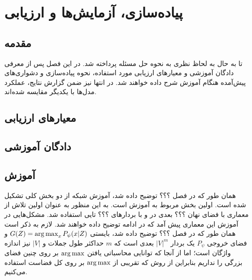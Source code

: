 \chapter{پیاده‌سازی، آزمایش‌ها و ارزیابی}\label{Chap:Chap4}
\minitoc
\section{مقدمه}
تا به حال به لحاظ نظری به نحوه حل مسئله پرداخته شد. در این فصل پس از معرفی دادگان آموزشی و معیارهای ارزیابی مورد استفاده، نحوه پیاده‌سازی و دشواری‌های پیش‌آمده هنگام آموزش شرح داده خواهند شد. در انتها نیز ضمن گزارش نتایج، عملکرد مدل‌ها با یکدیگر مقایسه شده‌اند.
\section{معیارهای ارزیابی}
\section{دادگان آموزشی}
\section{آموزش \wae{}}
همان طور که در فصل ؟؟؟ توضیح داده شد، آموزش شبکه از دو بخش کلی تشکیل شده است. اولین بخش مربوط به آموزش \wae{} است. به این منظور به عنوان اولین تلاش از معماری  با فضای نهان ؟؟؟ بعدی در \encoder{} و \decoder{} با بردارهای  \embedding{} ؟؟؟ تایی استفاده شد. مشکل‌هایی در آموزش این معماری پیش آمد که در ادامه توضیح داده خواهند شد. لازم به ذکر است همان طور که در فصل ؟؟؟ توضیح داده شد، \decoder{} بایستی 
$G(Z) = \operatorname*{arg\,max}_{x} P_\psi(x|Z)$
و فضای خروجی $P_\psi$ یک بردار $|V|^{m}$ بعدی است که $m$ حداکثر طول جملات و $|V|$ نیز اندازه واژگان است؛ اما از آنجا که توانایی محاسباتی یافتن $\operatorname*{arg\,max}$ بر روی چنین فضای بزرگی را نداریم بنابراین از روش 
که تقریبی از $\operatorname*{arg\,max}$ بر روی کل فضاست استفاده می‌کنیم.
\iffalse
